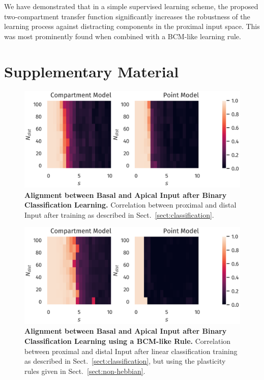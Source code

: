 \documentclass[10pt,a4paper,twocolumn]{article}
\begin{document}
		We have demonstrated that in a simple supervised learning scheme, the
		proposed two-compartment transfer function significantly increases
		the robustness of the learning process against distracting components
		in the proximal input space. This was most prominently found when
		combined with a BCM-like learning rule.
		
		\section{Supplementary Material}
		\begin{figure}
			\includegraphics[width=\columnwidth]{classification_correlation_dimension_scaling_high_input_dim}
			\caption{{\bf Alignment between Basal and Apical Input after Binary Classification Learning.}
				Correlation between proximal and distal Input after training as described in 
				Sect.~\ref{sect:classification}.}
			\label{fig:classification_correlation}
		\end{figure}
		
		\begin{figure}
			\includegraphics[width=\columnwidth]{classification_correlation_dimension_scaling_bcm_high_input_dim}
			\caption{{\bf Alignment between Basal and Apical Input after Binary Classification Learning
					using a BCM-like Rule.}
				Correlation between proximal and distal Input after linear classification 
				training as described in Sect.~\ref{sect:classification}, but using the plasticity
				rules given in Sect.~\ref{sect:non-hebbian}.}
			\label{fig:classification_correlation_bcm}
		\end{figure}
		
		
		
		
		
\end{document}
